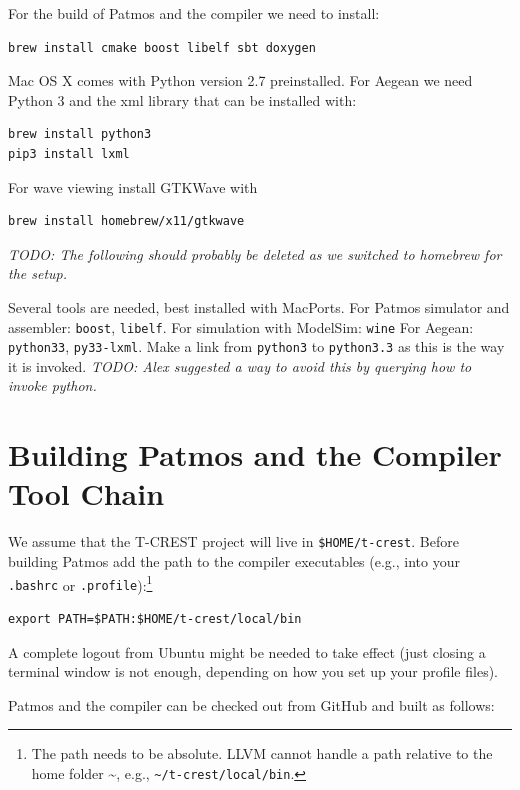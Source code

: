 \documentclass[a4paper,fontsize=10pt,twoside,DIV15,BCOR12mm,headinclude=true,footinclude=false,pagesize,bibtotoc]{scrbook}
\newcommand{\code}[1]{{\texttt{#1}}}
\newcommand{\todo}[1]{{\emph{TODO: #1}}}
\begin{document}
For the build of Patmos and the compiler we need to install:

\begin{verbatim}
brew install cmake boost libelf sbt doxygen
\end{verbatim}

Mac OS X comes with Python version 2.7 preinstalled. For Aegean
we need Python 3 and the xml library that can be installed with:

\begin{verbatim}
brew install python3
pip3 install lxml
\end{verbatim}

For wave viewing install GTKWave with

\begin{verbatim}
brew install homebrew/x11/gtkwave
\end{verbatim}

\todo{The following should probably be deleted as we switched to homebrew for the setup.}

Several tools are needed, best installed with MacPorts. For Patmos simulator and assembler:
\code{boost}, \code{libelf}.
For simulation with ModelSim: \code{wine}
For Aegean: \code{python33}, \code{py33-lxml}. Make a link from \code{python3} to \code{python3.3} as this is the way it is invoked.
\todo{Alex suggested a way to avoid this by querying how to invoke python.}

\section{Building Patmos and the Compiler Tool Chain}
\label{sec:build:compiler}

We assume that the T-CREST project will live in \code{\$HOME/t-crest}.
Before building Patmos add the path
to the compiler executables (e.g., into your \code{.bashrc} or
\code{.profile}):\footnote{The path needs to be absolute. LLVM cannot handle
a path relative to the home folder \textasciitilde{}, e.g., \code{\textasciitilde{}/t-crest/local/bin}.}

\begin{verbatim}
export PATH=$PATH:$HOME/t-crest/local/bin
\end{verbatim}

A complete logout from Ubuntu might be needed to take effect (just closing
a terminal window is not enough, depending on how you set up your profile files).

Patmos and the compiler can be checked out from GitHub and built as follows:
\end{document}
